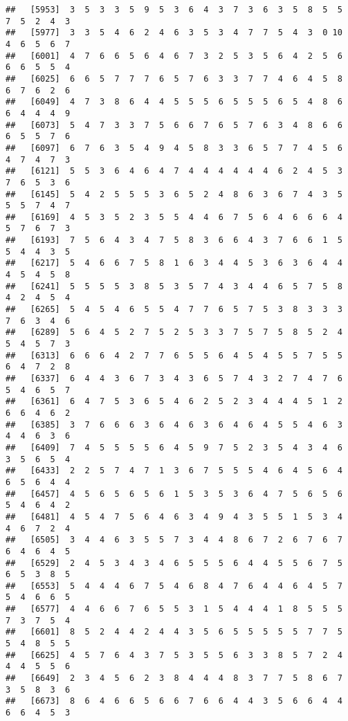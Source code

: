 \documentclass[
]{book}
\begin{document}
\begin{verbatim}
##   [5953]  3  5  3  3  5  9  5  3  6  4  3  7  3  6  3  5  8  5  5  7  5  2  4  3
##   [5977]  3  3  5  4  6  2  4  6  3  5  3  4  7  7  5  4  3  0 10  4  6  5  6  7
##   [6001]  4  7  6  6  5  6  4  6  7  3  2  5  3  5  6  4  2  5  6  6  6  5  5  4
##   [6025]  6  6  5  7  7  7  6  5  7  6  3  3  7  7  4  6  4  5  8  6  7  6  2  6
##   [6049]  4  7  3  8  6  4  4  5  5  5  6  5  5  5  6  5  4  8  6  6  4  4  4  9
##   [6073]  5  4  7  3  3  7  5  6  6  7  6  5  7  6  3  4  8  6  6  6  5  5  7  6
##   [6097]  6  7  6  3  5  4  9  4  5  8  3  3  6  5  7  7  4  5  6  4  7  4  7  3
##   [6121]  5  5  3  6  4  6  4  7  4  4  4  4  4  4  6  2  4  5  3  7  6  5  3  6
##   [6145]  5  4  2  5  5  5  3  6  5  2  4  8  6  3  6  7  4  3  5  5  5  7  4  7
##   [6169]  4  5  3  5  2  3  5  5  4  4  6  7  5  6  4  6  6  6  4  5  7  6  7  3
##   [6193]  7  5  6  4  3  4  7  5  8  3  6  6  4  3  7  6  6  1  5  5  4  4  3  5
##   [6217]  5  4  6  6  7  5  8  1  6  3  4  4  5  3  6  3  6  4  4  4  5  4  5  8
##   [6241]  5  5  5  5  3  8  5  3  5  7  4  3  4  4  6  5  7  5  8  4  2  4  5  4
##   [6265]  5  4  5  4  6  5  5  4  7  7  6  5  7  5  3  8  3  3  3  7  6  3  4  6
##   [6289]  5  6  4  5  2  7  5  2  5  3  3  7  5  7  5  8  5  2  4  5  4  5  7  3
##   [6313]  6  6  6  4  2  7  7  6  5  5  6  4  5  4  5  5  7  5  5  6  4  7  2  8
##   [6337]  6  4  4  3  6  7  3  4  3  6  5  7  4  3  2  7  4  7  6  5  4  6  5  7
##   [6361]  6  4  7  5  3  6  5  4  6  2  5  2  3  4  4  4  5  1  2  6  6  4  6  2
##   [6385]  3  7  6  6  6  3  6  4  6  3  6  4  6  4  5  5  4  6  3  4  4  6  3  6
##   [6409]  7  4  5  5  5  5  6  4  5  9  7  5  2  3  5  4  3  4  6  3  5  6  5  4
##   [6433]  2  2  5  7  4  7  1  3  6  7  5  5  5  4  6  4  5  6  4  6  5  6  4  4
##   [6457]  4  5  6  5  6  5  6  1  5  3  5  3  6  4  7  5  6  5  6  5  4  6  4  2
##   [6481]  4  5  4  7  5  6  4  6  3  4  9  4  3  5  5  1  5  3  4  4  6  7  2  4
##   [6505]  3  4  4  6  3  5  5  7  3  4  4  8  6  7  2  6  7  6  7  6  4  6  4  5
##   [6529]  2  4  5  3  4  3  4  6  5  5  5  6  4  4  5  5  6  7  5  6  5  3  8  5
##   [6553]  5  4  4  4  6  7  5  4  6  8  4  7  6  4  4  6  4  5  7  5  4  6  6  5
##   [6577]  4  4  6  6  7  6  5  5  3  1  5  4  4  4  1  8  5  5  5  7  3  7  5  4
##   [6601]  8  5  2  4  4  2  4  4  3  5  6  5  5  5  5  5  7  7  5  5  4  8  5  5
##   [6625]  4  5  7  6  4  3  7  5  3  5  5  6  3  3  8  5  7  2  4  4  4  5  5  6
##   [6649]  2  3  4  5  6  2  3  8  4  4  4  8  3  7  7  5  8  6  7  3  5  8  3  6
##   [6673]  8  6  4  6  6  5  6  6  7  6  6  4  4  3  5  6  6  4  4  6  6  4  5  3

\end{verbatim}
\end{document}
